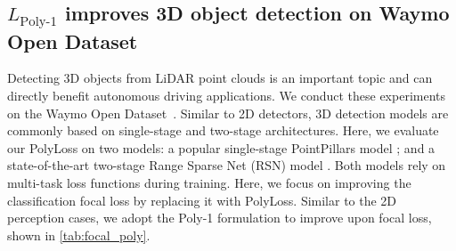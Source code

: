 \subsection{\texorpdfstring{$L_{\text{Poly-1}}$}{} improves 3D object detection on Waymo Open Dataset}
\vspace{-8pt}
\begin{table}[!h]
\caption{\textbf{PolyLoss vs. focal loss for 3D detection models.} Differences are highlighted in red. We found the best Poly-1 for PointPillars is $\epsilon_1 =-1$, which is equivalent to dropping the first term. Therefore, for RSN, we drop the first term and tune the new leading polynomial $(1-P_t)^{\gamma+2}$.  }
\label{tab:focal_poly}
\vspace{-5pt}
\end{table}

Detecting 3D objects from LiDAR point clouds is an important topic and can directly benefit autonomous driving applications. 
We conduct these experiments on the Waymo Open Dataset~\citep{sun2020scalability}.
Similar to 2D detectors, 3D detection models are commonly based on single-stage and two-stage architectures. Here, we evaluate our PolyLoss on two models: a popular single-stage PointPillars model \citep{lang2019pointpillars}; and a state-of-the-art two-stage Range Sparse Net (RSN) model \citep{rsn}. Both models rely on multi-task loss functions during training. Here, we focus on improving the classification focal loss by replacing it with PolyLoss. Similar to the 2D perception cases, we adopt the Poly-1 formulation to improve upon focal loss, shown in \autoref{tab:focal_poly}.

